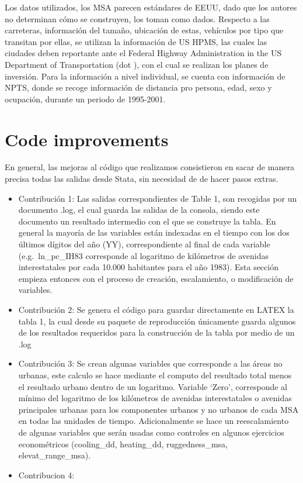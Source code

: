 \documentclass[
]{article}
\begin{document}
Los datos utilizados, los MSA parecen estándares de EEUU, dado que los
autores no determinan cómo se construyen, los toman como dados. Respecto
a las carreteras, información del tamaño, ubicación de estas, vehículos
por tipo que transitan por ellas, se utilizan la información de US HPMS,
las cuales las ciudades deben reportante ante el Federal Highway
Administration in the US Department of Transportation (dot ), con el
cual se realizan los planes de inversión. Para la información a nivel
individual, se cuenta con información de NPTS, donde se recoge
información de distancia pro persona, edad, sexo y ocupación, durante un
periodo de 1995-2001.

\hypertarget{code-improvements}{%
\section{Code improvements}\label{code-improvements}}

En general, las mejoras al código que realizamos consistieron en sacar
de manera precisa todas las salidas desde Stata, sin necesidad de de
hacer pasos extras.

\begin{itemize}
\item
  Contribución 1: Las salidas correspondientes de Table 1, son recogidas
  por un documento .log, el cual guarda las salidas de la consola,
  siendo este documento un resultado intermedio con el que se construye
  la tabla. En general la mayoría de las variables están indexadas en el
  tiempo con los dos últimos dígitos del año (YY), correspondiente al
  final de cada variable (e.g.~ln\_pc\_IH83 corresponde al logaritmo de
  kilómetros de avenidas interestatales por cada 10.000 habitantes para
  el año 1983). Esta sección empieza entonces con el proceso de
  creación, escalamiento, o modificación de variables.
\item
  Contribución 2: Se genera el código para guardar directamente en LATEX
  la tabla 1, la cual desde su paquete de reproducción únicamente guarda
  algunos de los resultados requeridos para la construcción de la tabla
  por medio de un .log
\item
  Contribución 3: Se crean algunas variables que corresponde a las áreas
  no urbanas, este calculo se hace mediante el computo del resultado
  total menos el resultado urbano dentro de un logaritmo. Variable
  `Zero', corresponde al mínimo del logaritmo de los kilómetros de
  avenidas interestatales o avenidas principales urbanas para los
  componentes urbanos y no urbanos de cada MSA en todas las unidades de
  tiempo. Adicionalmente se hace un reescalamiento de algunas variables
  que serán usadas como controles en algunos ejercicios econométricos
  (cooling\_dd, heating\_dd, ruggedness\_msa, elevat\_range\_msa).
\item
  Contribucion 4:
\end{itemize}
\end{document}
